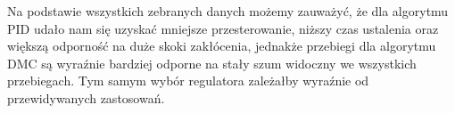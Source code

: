 \begin{figure}[H]
\centering

\label{DMCbest}
\end{figure}

Na podstawie wszystkich zebranych danych możemy zauważyć, że dla algorytmu PID udało nam się uzyskać mniejsze przesterowanie, niższy czas ustalenia oraz większą odporność na duże skoki zakłócenia, jednakże przebiegi dla algorytmu DMC są wyraźnie bardziej odporne na stały szum widoczny we wszystkich przebiegach. Tym samym wybór regulatora zależałby wyraźnie od przewidywanych zastosowań.

